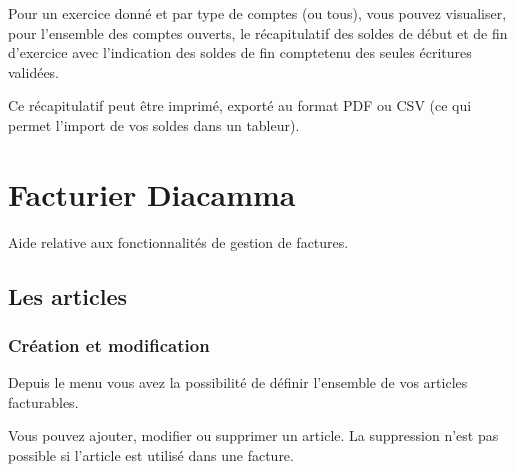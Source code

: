 \documentclass[a4paper,10pt,oneside,french]{sphinxmanual}
\begin{document}
\sphinxAtStartPar
Pour un exercice donné et par type de comptes (ou tous), vous pouvez visualiser, pour l’ensemble des comptes ouverts, le récapitulatif des soldes de début et de fin d’exercice avec l’indication des soldes de fin compte\sphinxhyphen{}tenu des seules écritures validées.

\sphinxAtStartPar
Ce récapitulatif peut être imprimé, exporté au format PDF ou CSV (ce qui permet l’import de vos soldes dans un tableur).


\chapter{Facturier Diacamma}
\label{\detokenize{invoice/index:facturier-diacamma}}\label{\detokenize{invoice/index::doc}}
\sphinxAtStartPar
Aide relative aux fonctionnalités de gestion de factures.


\section{Les articles}
\label{\detokenize{invoice/articles:les-articles}}\label{\detokenize{invoice/articles::doc}}

\subsection{Création et modification}
\label{\detokenize{invoice/articles:creation-et-modification}}
\sphinxAtStartPar
Depuis le menu  vous avez la possibilité de définir l’ensemble de vos articles facturables.

\noindent{}

\sphinxAtStartPar
Vous pouvez ajouter, modifier ou supprimer un article. La suppression n’est pas possible si l’article est utilisé dans une facture.
\end{document}

